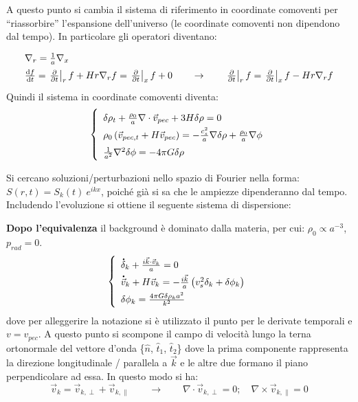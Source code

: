 A questo punto si cambia il sistema di riferimento in coordinate comoventi per ``riassorbire'' l'espansione dell'universo (le coordinate comoventi non dipendono dal tempo). In particolare gli operatori diventano:
\begin{equation*}
    \def\arraystretch{1.5}
    \begin{array}{l}
        \nabla_r = \frac{1}{a}\nabla_x \\
        \frac{\d{f}}{\d{t}} = \left. \frac{\partial}{\partial t} \right|_r f + Hr \nabla_r f = \left. \frac{\partial}{\partial t} \right|_x f + 0 \qquad \rightarrow \qquad \left. \frac{\partial}{\partial t} \right|_r f = \left. \frac{\partial}{\partial t} \right|_x f - Hr \nabla_r f  
    \end{array}
\end{equation*}
Quindi il sistema in coordinate comoventi diventa:
\begin{equation}\left\{
    \def\arraystretch{1.5}
    \begin{array}{l}
        \delta\rho_t + \frac{\rho_0}{a} \nabla \cdot\vec{v}_{pec} + 3H \delta\rho =0 \\
        \rho_0 \left ( \vec{v}_{pec, t} + H \vec{v}_{pec} \right) = -\frac{c_s^2}{a} \nabla\delta\rho +\frac{\rho_0}{a}\nabla\phi \\
        \frac{1}{a^2}\nabla^2 \delta \phi = -4\pi G \delta\rho 
    \end{array}\right.
\end{equation}

Si  cercano  soluzioni/perturbazioni  nello  spazio  di Fourier nella forma: $S(r,t) =S_k (t)\: e^{ikx}$, poiché già si sa che le ampiezze dipenderanno dal tempo. Includendo l'evoluzione  si ottiene il seguente sistema di dispersione: 

\textbf{Dopo l'equivalenza} il background è dominato dalla materia, per cui: $\rho_0 \propto a^{-3}$, $p_{rad}=0$.
\begin{equation}\left\{
    \def\arraystretch{1.5}
    \begin{array}{l}
        \dt{\delta}_{k} + \frac{i\vec{k}\cdot\vec{v}_k}{a}=0 \\
        \dt{\vec{v}}_k + H \vec{v}_k = -\frac{i\vec{k}}{a}\left( v_s^2 \delta_k + \delta\phi_k\right) \\
        \delta\phi_k = \frac{4 \pi G \delta \rho_k a^2}{k^2}
    \end{array}\right.
\end{equation}
dove per alleggerire la notazione si è utilizzato il punto per le derivate temporali e $v=v_{pec}$. A questo punto si scompone il campo di velocità lungo la terna ortonormale del vettore d'onda \{$\hat{n}$, $\hat{t}_1$, $\hat{t}_2$\} dove la prima componente rappresenta la direzione longitudinale / parallela a $\vec{k}$ e le altre due formano il piano perpendicolare ad essa. In questo modo si ha:
$$
\vec{v}_k = \vec{v}_{k,\perp} + \vec{v}_{k,\parallel} \qquad \rightarrow \qquad \nabla \cdot \vec{v}_{k,\perp} = 0; \quad \nabla \times  \vec{v}_{k,\parallel} =0
$$


